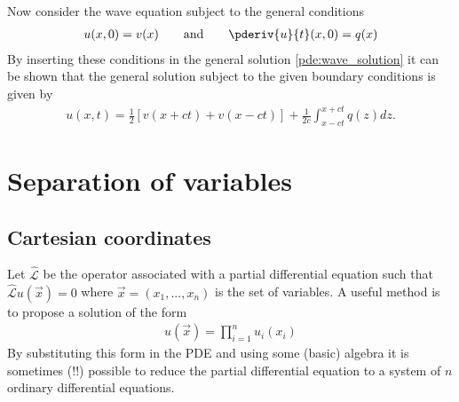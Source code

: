 	Now consider the wave equation subject to the general conditions
	\begin{gather}
		u(x, 0) = v(x)\qquad\text{and}\qquad \pderiv{u}{t}(x, 0) = q(x)
	\end{gather}
	By inserting these conditions in the general solution \ref{pde:wave_solution} it can be shown that the general solution subject to the given boundary conditions is given by
	\begin{gather}
		\label{pde:dalembert_solution}
		u(x, t) = \frac{1}{2}\left[v(x+ct) + v(x-ct)\right] + \frac{1}{2c}\int_{x-ct}^{x+ct}q(z)dz.
	\end{gather}
    

\section{Separation of variables}


\subsection{Cartesian coordinates}

	\begin{method}
		Let $\hat{\mathcal{L}}$ be the operator associated with a partial differential equation such that $\hat{\mathcal{L}}u(\vec{x}) = 0$ where $\vec{x} = (x_1,...,x_n)$ is the set of variables. A useful method is to propose a solution of the form
		\begin{gather}
			u(\vec{x}) = \prod_{i=1}^nu_i(x_i)
		\end{gather}
		By substituting this form in the PDE and using some (basic) algebra it is sometimes (!!) possible to reduce the partial differential equation to a system of $n$ ordinary differential equations.
	\end{method}
    
